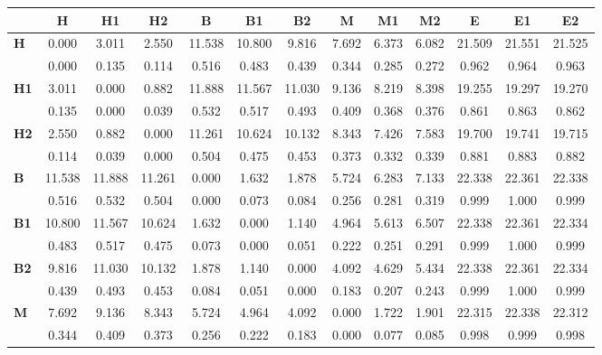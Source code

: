 \begin{table*}[h!]
\begin{center}
\begin{tabular}{| l || c | c | c || c | c | c || c | c | c || c | c | c |}\hline
 & {\bf H} & {\bf H1} & {\bf H2} & {\bf B} & {\bf B1} & {\bf B2} & {\bf M} & {\bf M1} & {\bf M2} & {\bf E} & {\bf E1} & {\bf E2} \\\hline\hline
{\bf H} & 0.000 & 3.011 & 2.550 & 11.538 & 10.800 & 9.816 & 7.692 & 6.373 & 6.082 & 21.509 & 21.551 & 21.525 \\
 & 0.000  & 0.135  & 0.114  & 0.516  & 0.483  & 0.439  & 0.344  & 0.285  & 0.272  & 0.962  & 0.964  & 0.963 \\\hline
{\bf H1} & 3.011 & 0.000 & 0.882 & 11.888 & 11.567 & 11.030 & 9.136 & 8.219 & 8.398 & 19.255 & 19.297 & 19.270 \\
 & 0.135  & 0.000  & 0.039  & 0.532  & 0.517  & 0.493  & 0.409  & 0.368  & 0.376  & 0.861  & 0.863  & 0.862 \\\hline
{\bf H2} & 2.550 & 0.882 & 0.000 & 11.261 & 10.624 & 10.132 & 8.343 & 7.426 & 7.583 & 19.700 & 19.741 & 19.715 \\
 & 0.114  & 0.039  & 0.000  & 0.504  & 0.475  & 0.453  & 0.373  & 0.332  & 0.339  & 0.881  & 0.883  & 0.882 \\\hline\hline
{\bf B} & 11.538 & 11.888 & 11.261 & 0.000 & 1.632 & 1.878 & 5.724 & 6.283 & 7.133 & 22.338 & 22.361 & 22.338 \\
 & 0.516  & 0.532  & 0.504  & 0.000  & 0.073  & 0.084  & 0.256  & 0.281  & 0.319  & 0.999  & 1.000  & 0.999 \\\hline
{\bf B1} & 10.800 & 11.567 & 10.624 & 1.632 & 0.000 & 1.140 & 4.964 & 5.613 & 6.507 & 22.338 & 22.361 & 22.334 \\
 & 0.483  & 0.517  & 0.475  & 0.073  & 0.000  & 0.051  & 0.222  & 0.251  & 0.291  & 0.999  & 1.000  & 0.999 \\\hline
{\bf B2} & 9.816 & 11.030 & 10.132 & 1.878 & 1.140 & 0.000 & 4.092 & 4.629 & 5.434 & 22.338 & 22.361 & 22.334 \\
 & 0.439  & 0.493  & 0.453  & 0.084  & 0.051  & 0.000  & 0.183  & 0.207  & 0.243  & 0.999  & 1.000  & 0.999 \\\hline\hline
{\bf M} & 7.692 & 9.136 & 8.343 & 5.724 & 4.964 & 4.092 & 0.000 & 1.722 & 1.901 & 22.315 & 22.338 & 22.312 \\
 & 0.344  & 0.409  & 0.373  & 0.256  & 0.222  & 0.183  & 0.000  & 0.077  & 0.085  & 0.998  & 0.999  & 0.998 \\\hline

\end{tabular}
\end{center}
\end{table*}
